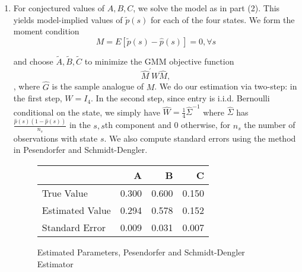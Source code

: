 \documentclass{article}
\begin{document}
\begin{enumerate}
\begin{answer}
\begin{enumerate}
\item For conjectured values of $A,B,C$, we solve the model as in part (2). This yields model-implied values of $\tilde p(s)$ for each of the four states. We form the moment condition $$ M=E[\tilde{p}(s)-\hat{p}(s)]=0,\forall s$$

and choose $\tilde{A},\tilde{B},\tilde{C}$ to minimize the GMM objective function $$\hat{M}^\prime W \hat{M},$$, where $\hat{G}$ is the sample analogue of $M$. We do our estimation via two-step: in the first step, $W=I_{4}$. In the second step, since entry is i.i.d. Bernoulli conditional on the state, we simply have $\hat W = \frac{1}{4}\hat{\Sigma}^{-1}$ where $\hat{\Sigma}$ has $  \frac{\hat{p}(s)(1-\hat{p}(s))}{n_s}$ in the $s,s$th component and 0 otherwise, for $n_s$ the number of observations with state $s$. We also compute standard errors using the method in Pesendorfer and Schmidt-Dengler.


\begin{figure}[h]
\centering
\caption{Estimated Parameters,  Pesendorfer and Schmidt-Dengler Estimator}
\begin{tabular}{l|rr r }  
& A & B & C \\
\hline

True Value  & 0.300 &0.600& 0.150 \\ 
Estimated Value& 0.294 &0.578& 0.152 \\ 
Standard Error & 0.009 &0.031&  0.007
 \end{tabular}
\end{figure}

\end{enumerate}
\end{answer}
    
\end{enumerate}
\end{document}
